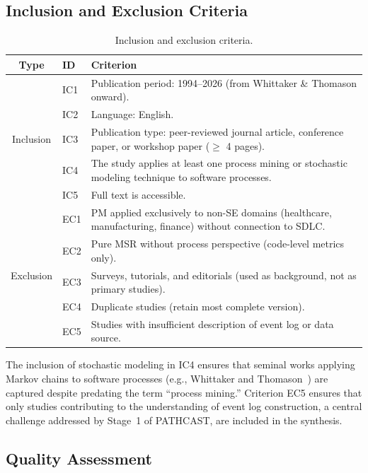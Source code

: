 \subsection{Inclusion and Exclusion Criteria}
\label{sec:slr-criteria}

\begin{table}[htbp]
\centering
\caption{Inclusion and exclusion criteria.}
\label{tab:criteria}
\begin{tabular}{clp{10cm}}
\toprule
\textbf{Type} & \textbf{ID} & \textbf{Criterion} \\
\midrule
\multirow{5}{*}{Inclusion}
& IC1 & Publication period: 1994--2026 (from Whittaker \& Thomason onward). \\
& IC2 & Language: English. \\
& IC3 & Publication type: peer-reviewed journal article, conference paper, or workshop paper ($\geq$ 4 pages). \\
& IC4 & The study applies at least one process mining or stochastic modeling technique to software processes. \\
& IC5 & Full text is accessible. \\
\midrule
\multirow{5}{*}{Exclusion}
& EC1 & PM applied exclusively to non-SE domains (healthcare, manufacturing, finance) without connection to SDLC. \\
& EC2 & Pure MSR without process perspective (code-level metrics only). \\
& EC3 & Surveys, tutorials, and editorials (used as background, not as primary studies). \\
& EC4 & Duplicate studies (retain most complete version). \\
& EC5 & Studies with insufficient description of event log or data source. \\
\bottomrule
\end{tabular}
\end{table}

The inclusion of stochastic modeling in IC4 ensures that seminal works applying Markov chains to software processes (e.g., Whittaker and Thomason~\cite{whittaker1994}) are captured despite predating the term ``process mining.'' Criterion EC5 ensures that only studies contributing to the understanding of event log construction, a central challenge addressed by Stage~1 of PATHCAST, are included in the synthesis.


\subsection{Quality Assessment}
\label{sec:slr-qa}

